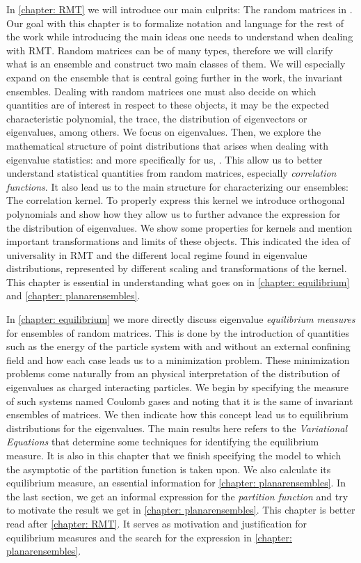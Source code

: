 In \autoref{chapter: RMT} we will introduce our main culprits: The random matrices in . Our goal with this chapter is to formalize notation and language for the rest of the work while introducing the main ideas one needs to understand when dealing with RMT. Random matrices can be of many types, therefore we will clarify what is an ensemble and construct two main classes of them. We will especially expand on the ensemble that is central going further in the work, the invariant ensembles. Dealing with random matrices one must also decide on which quantities are of interest in respect to these objects, it may be the expected characteristic polynomial, the trace, the distribution of eigenvectors or eigenvalues, among others. We focus on eigenvalues. Then, we explore the mathematical structure of point distributions that arises when dealing with eigenvalue statistics:  and more specifically for us, . This allow us to better understand statistical quantities from random matrices, especially \textit{correlation functions}. It also lead us to the main structure for characterizing our ensembles: The correlation kernel. To properly express this kernel we introduce orthogonal polynomials and show how they allow us to further advance the expression for the distribution of eigenvalues. We show some properties for kernels and mention important transformations and limits of these objects. This indicated the idea of universality in RMT and the different local regime found in eigenvalue distributions, represented by different scaling and transformations of the kernel. This chapter is essential in understanding what goes on in \autoref{chapter: equilibrium} and \autoref{chapter: planarensembles}.
 

 In \autoref{chapter: equilibrium} we more directly discuss eigenvalue \textit{equilibrium measures} for ensembles of random matrices. This is done by the introduction of quantities such as the energy of the particle system with and without an external confining field and how each case leads us to a minimization problem. These minimization problems come naturally from an physical interpretation of the distribution of eigenvalues as charged interacting particles. We begin by specifying the measure of such systems named Coulomb gases and noting that it is the same of invariant ensembles of matrices. We then indicate how this concept lead us to equilibrium distributions for the eigenvalues. The main results here refers to the \textit{Variational Equations} that determine some techniques for identifying the equilibrium measure. It is also in this chapter that we finish specifying the model to which the asymptotic of the partition function is taken upon. We also calculate its equilibrium measure, an essential information for \autoref{chapter: planarensembles}. In the last section, we get an informal expression for the \textit{partition function} and try to motivate the result we get in \autoref{chapter: planarensembles}. This chapter is better read after \autoref{chapter: RMT}. It serves as motivation and justification for equilibrium measures and the search for the expression in \autoref{chapter: planarensembles}.
 
